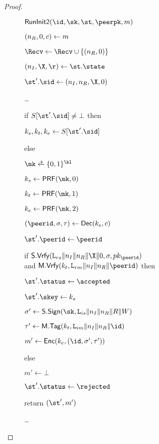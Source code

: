 \begin{proof}
\begin{figure}[tp]
{\begin{minipage}[t]{0.49\textwidth}
      \begin{oracle}{$\RunInit(\id,\sk,\st,\peerpk,m)$}
      \iffull
        \item $(\nonce_R,\Y,\ciph) \gets m$
        \item $\Recv \gets \Recv \cup \{(\nonce_R,\Y)\}$
        \item $(\nonce_I,\X,\r) \gets \st.\state$
        \item $\st'.\sid \gets (\nonce_I,\nonce_R,\X,\Y)$
      \else
        \item \dots
      \fi
        \item if $\S[\st'.\sid] \neq \bot$ then
        \item \hindent $\ks,\kt,\ke \gets \S[\st'.\sid]$
        \item else
        \item \hindent $\mk\sample \bits^{\kl}$
        \item \hindent {}
        \item \hindent \hindent {}
        \item \hindent \hindent \hindent {}
        \item \hindent \gamechange{$\Q[\st'.\sid] \gets (\r,\bot,\mk)$}
        \item \hindent $\ks \gets \PRF(\mk,0)$
        \item \hindent $\kt \gets \PRF(\mk,1)$
        \item \hindent $\ke \gets \PRF(\mk,2)$
      \iffull
        \item $(\peerid,\sigma, \tau) \gets \ENCDec(\ke, \ciph)$ 
        \item $\st'.\peerid \gets \peerid$
        \item if $\SIGScheme.\SIGVerify(\labelrs\|\nonce_I\|\nonce_R\|\X\|\Y, \sigma, \pk_{\peerid})$\\
		and $\MACScheme.\MACVerify(\kt, \labelrm\|\nonce_I\|\nonce_R\|\peerid)$ then
        \item \hindent $\st'.\status \gets \accepted$
        \item \hindent $\st'.\skey \gets \ks$
        \item \hindent $\sigma' \gets \SIGScheme.\SIGSign(\sk, \labelis\|\nonce_I\|\nonce_R\|R\|W)$
        \item \hindent $\tau' \gets \MACScheme.\MACTag(\kt, \labelim\|\nonce_I\|\nonce_R\|\id)$
        \item \hindent $m' \gets \ENCEnc(\ke,(\id, \sigma', \tau'))$
        \item else
        \item \hindent $m' \gets \bot$
        \item \hindent $\st'.\status \gets \rejected$
        \item return $(\st', m')$
      \else
        \item \dots
      \fi
      \end{oracle}


\end{minipage}}
\end{figure}
\end{proof}

